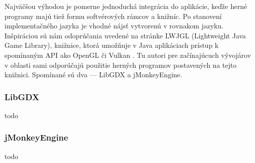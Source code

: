 Najväčšou výhodou je pomerne jednoduchá integrácia do aplikácie, keďže herné programy majú tiež formu softvérových rámcov a knižníc. Po stanovení implementačného jazyka je vhodné nájsť  vytvorenú v rovnakom jazyku. Inšpiráciou sú nám odoprúčania uvedené na stránke LWJGL (Lightweight Java Game Library), knižnice, ktorá umožňuje v Java aplikáciach prístup k spomínaným API ako OpenGL či Vulkan \cite{LWJGL}. Tu autori pre začínajúcuch vývojárov v oblasti sami odporúčajú použitie herných programov postavených na tejto knižnici. Spomínané sú dva --- LibGDX a jMonkeyEngine.

\subsubsection{LibGDX}
todo

\subsubsection{jMonkeyEngine}
todo















